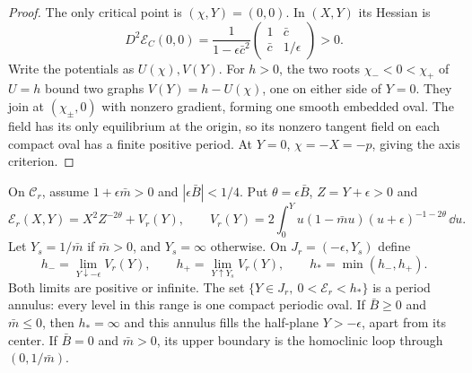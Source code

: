 \begin{proof}
The only critical point is $(\chi,Y)=(0,0)$. In $(X,Y)$ its Hessian
is
\begin{equation}\label{rw:centers:separated-hessian}
 D^2\mathcal E_C(0,0)=\frac1{1-\epsilon\bar c^2}
       \begin{pmatrix}1&\bar c\\\bar c&1/\epsilon\end{pmatrix}>0.
\end{equation}
Write the potentials as $U(\chi),V(Y)$. For $h>0$, the two roots
$\chi_-<0<\chi_+$ of $U=h$ bound two graphs
$V(Y)=h-U(\chi)$, one on either side of $Y=0$.
They join at $(\chi_\pm,0)$ with nonzero gradient, forming one
smooth embedded oval. The field has its only equilibrium at the
origin, so its nonzero tangent field on each compact oval has a
finite positive period. At $Y=0$, $\chi=-X=-p$, giving the axis criterion.
\end{proof}

\begin{proposition}\label{rw:centers:reversible}
On $\mathcal C_r$, assume $1+\epsilon\bar m>0$ and
$|\epsilon\bar B|<1/4$. Put $\theta=\epsilon\bar B$,
$Z=Y+\epsilon>0$ and
\begin{equation}\label{rw:centers:reversible-energy}
 \mathcal E_r(X,Y)=X^2 Z^{-2\theta}+V_r(Y),\qquad
 V_r(Y)=2\int_0^Y u(1-\bar m u)(u+\epsilon)^{-1-2\theta}\,\dd u.
\end{equation}
Let $Y_s=1/\bar m$ if $\bar m>0$, and $Y_s=\infty$ otherwise.
On $J_r=(-\epsilon,Y_s)$ define
\[
 h_- =\lim_{Y\downarrow-\epsilon}V_r(Y),\qquad
 h_+ =\lim_{Y\uparrow Y_s}V_r(Y),\qquad h_* =\min(h_-,h_+).
\]
Both limits are positive or infinite. The set
$\{Y\in J_r,\ 0<\mathcal E_r<h_*\}$ is a period annulus:
every level in this range is one compact periodic oval. If
$\bar B\ge0$ and $\bar m\le0$, then $h_*=\infty$ and this
annulus fills the half-plane $Y> -\epsilon$, apart from its center.
If $\bar B=0$ and $\bar m>0$, its upper boundary is the
homoclinic loop through $(0,1/\bar m)$.
\end{proposition}

